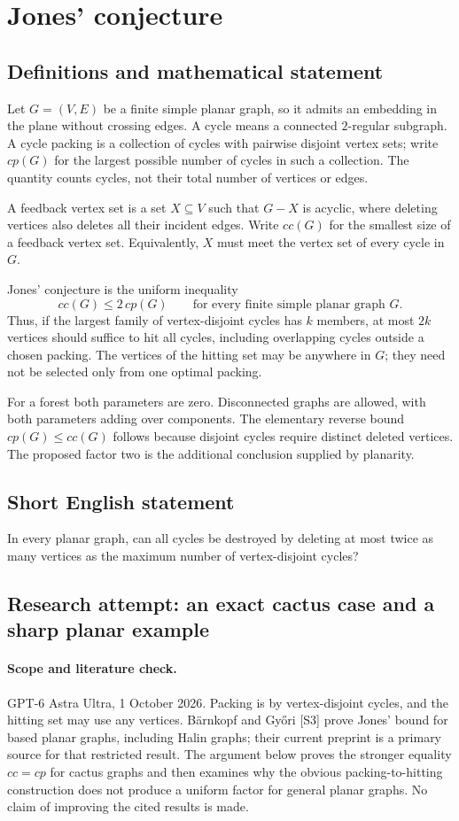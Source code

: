 \documentclass[11pt,a4paper]{article}
\begin{document}
\section*{Jones' conjecture}\label{statement}

\subsection{Definitions and mathematical statement}
Let $G=(V,E)$ be a finite simple planar graph, so it admits
an embedding in the plane without crossing edges. A cycle
means a connected $2$-regular subgraph. A cycle packing is
a collection of cycles with pairwise disjoint vertex sets;
write $cp(G)$ for the largest possible number of cycles in
such a collection. The quantity counts cycles, not their
total number of vertices or edges.

A feedback vertex set is a set $X\subseteq V$ such that
$G-X$ is acyclic, where deleting vertices also deletes all
their incident edges. Write $cc(G)$ for the smallest size
of a feedback vertex set. Equivalently, $X$ must meet the
vertex set of every cycle in $G$.

Jones' conjecture is the uniform inequality
\[
 cc(G)\leq2\,cp(G)
 \qquad\text{for every finite simple planar graph }G.
\]
Thus, if the largest family of vertex-disjoint cycles has
$k$ members, at most $2k$ vertices should suffice to hit all
cycles, including overlapping cycles outside a chosen packing.
The vertices of the hitting set may be anywhere in $G$;
they need not be selected only from one optimal packing.

For a forest both parameters are zero. Disconnected graphs
are allowed, with both parameters adding over components.
The elementary reverse bound $cp(G)\leq cc(G)$ follows
because disjoint cycles require distinct deleted vertices.
The proposed factor two is the additional conclusion
supplied by planarity.
\subsection{Short English statement}
In every planar graph, can all cycles be destroyed by deleting at most twice as many vertices as the maximum number of vertex-disjoint cycles?
\subsection{Research attempt: an exact cactus case and a sharp planar example}
\paragraph{Scope and literature check.}
GPT-6 Astra Ultra, 1 October 2026. Packing is by vertex-disjoint
cycles, and the hitting set may use any vertices. Bärnkopf and Győri
[S3] prove Jones' bound for based planar graphs, including Halin
graphs; their current preprint is a primary source for that restricted
result. The argument below proves the stronger equality $cc=cp$ for
cactus graphs and then examines why the obvious packing-to-hitting
construction does not produce a uniform factor for general planar
graphs. No claim of improving the cited results is made.
\end{document}
